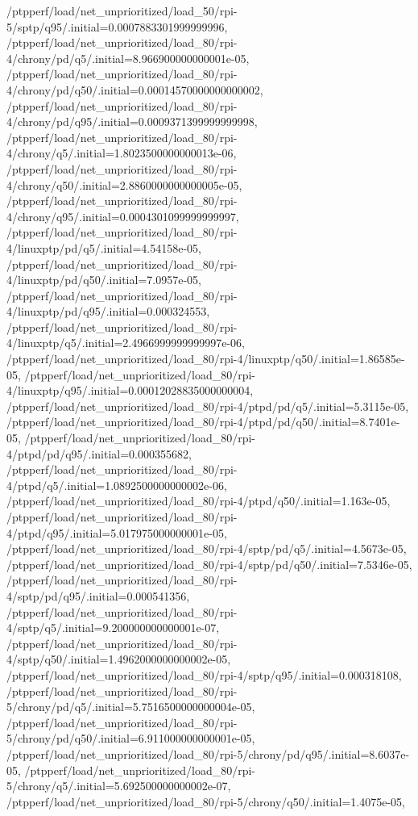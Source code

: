 {    /ptpperf/load/net_unprioritized/load_50/rpi-5/sptp/q95/.initial=0.0007883301999999996,
    /ptpperf/load/net_unprioritized/load_80/rpi-4/chrony/pd/q5/.initial=8.966900000000001e-05,
    /ptpperf/load/net_unprioritized/load_80/rpi-4/chrony/pd/q50/.initial=0.00014570000000000002,
    /ptpperf/load/net_unprioritized/load_80/rpi-4/chrony/pd/q95/.initial=0.0009371399999999998,
    /ptpperf/load/net_unprioritized/load_80/rpi-4/chrony/q5/.initial=1.8023500000000013e-06,
    /ptpperf/load/net_unprioritized/load_80/rpi-4/chrony/q50/.initial=2.8860000000000005e-05,
    /ptpperf/load/net_unprioritized/load_80/rpi-4/chrony/q95/.initial=0.0004301099999999997,
    /ptpperf/load/net_unprioritized/load_80/rpi-4/linuxptp/pd/q5/.initial=4.54158e-05,
    /ptpperf/load/net_unprioritized/load_80/rpi-4/linuxptp/pd/q50/.initial=7.0957e-05,
    /ptpperf/load/net_unprioritized/load_80/rpi-4/linuxptp/pd/q95/.initial=0.000324553,
    /ptpperf/load/net_unprioritized/load_80/rpi-4/linuxptp/q5/.initial=2.4966999999999997e-06,
    /ptpperf/load/net_unprioritized/load_80/rpi-4/linuxptp/q50/.initial=1.86585e-05,
    /ptpperf/load/net_unprioritized/load_80/rpi-4/linuxptp/q95/.initial=0.00012028835000000004,
    /ptpperf/load/net_unprioritized/load_80/rpi-4/ptpd/pd/q5/.initial=5.3115e-05,
    /ptpperf/load/net_unprioritized/load_80/rpi-4/ptpd/pd/q50/.initial=8.7401e-05,
    /ptpperf/load/net_unprioritized/load_80/rpi-4/ptpd/pd/q95/.initial=0.000355682,
    /ptpperf/load/net_unprioritized/load_80/rpi-4/ptpd/q5/.initial=1.0892500000000002e-06,
    /ptpperf/load/net_unprioritized/load_80/rpi-4/ptpd/q50/.initial=1.163e-05,
    /ptpperf/load/net_unprioritized/load_80/rpi-4/ptpd/q95/.initial=5.017975000000001e-05,
    /ptpperf/load/net_unprioritized/load_80/rpi-4/sptp/pd/q5/.initial=4.5673e-05,
    /ptpperf/load/net_unprioritized/load_80/rpi-4/sptp/pd/q50/.initial=7.5346e-05,
    /ptpperf/load/net_unprioritized/load_80/rpi-4/sptp/pd/q95/.initial=0.000541356,
    /ptpperf/load/net_unprioritized/load_80/rpi-4/sptp/q5/.initial=9.200000000000001e-07,
    /ptpperf/load/net_unprioritized/load_80/rpi-4/sptp/q50/.initial=1.4962000000000002e-05,
    /ptpperf/load/net_unprioritized/load_80/rpi-4/sptp/q95/.initial=0.000318108,
    /ptpperf/load/net_unprioritized/load_80/rpi-5/chrony/pd/q5/.initial=5.7516500000000004e-05,
    /ptpperf/load/net_unprioritized/load_80/rpi-5/chrony/pd/q50/.initial=6.911000000000001e-05,
    /ptpperf/load/net_unprioritized/load_80/rpi-5/chrony/pd/q95/.initial=8.6037e-05,
    /ptpperf/load/net_unprioritized/load_80/rpi-5/chrony/q5/.initial=5.692500000000002e-07,
    /ptpperf/load/net_unprioritized/load_80/rpi-5/chrony/q50/.initial=1.4075e-05,
}
